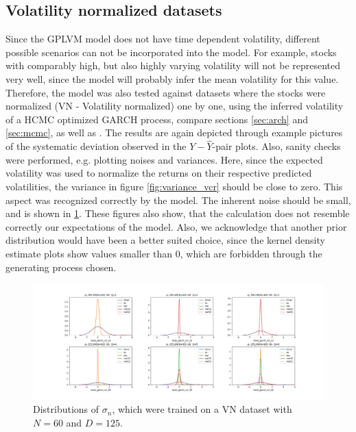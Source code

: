 \subsection{Volatility normalized datasets}
Since the GPLVM model does not have time dependent volatility, different possible scenarios can not be incorporated into the model. For example, stocks with comparably high, but also highly varying volatility will not be represented very well, since the model will probably infer the mean volatility for this value. Therefore, the model was also tested against datasets where the stocks were normalized (VN - Volatility normalized) one by one, using the inferred volatility of a HCMC optimized GARCH process, compare sections \ref{sec:arch} and \ref{sec:mcmc}, as well as \cite{pyflux}. The results are again depicted through example pictures of the systematic deviation observed in the $Y-\hat{Y}$-pair plots. Also, sanity checks were performed, e.g. plotting noises and variances. Here, since the expected volatility was used to normalize the returns on their respective predicted volatilities, the variance in figure \ref{fig:variance_vcr} should be close to zero. This aspect was recognized correctly by the model. The inherent noise should be small, and is shown in \ref{fig:noise_vcr}. These figures also show, that the calculation does not resemble correctly our expectations of the model. Also, we acknowledge that another prior distribution would have been a better suited choice, since the kernel density estimate plots show values smaller than 0, which are forbidden through the generating process chosen. 
\begin{figure}[h!]
	\centering
	\includegraphics[width=7in]{img/07_0/noise_GPLVM_vcr_60.png}
	\caption[Noise Distribution of GPLVM with VCR dataset]{Distributions of $\sigma_{n}$, which were trained on a VN dataset with $N=60$ and $D=125$.}
	\label{fig:noise_vcr}
\end{figure}
